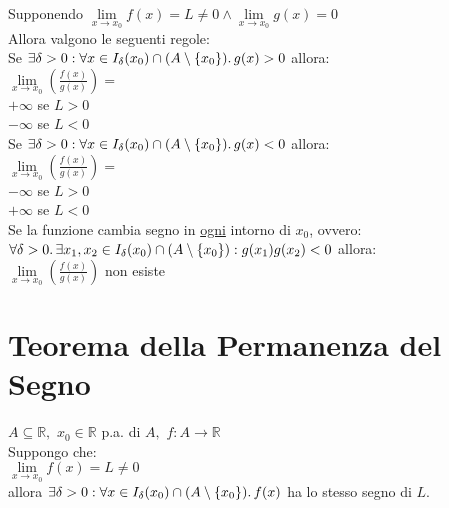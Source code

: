 \documentclass[a4paper, twoside, italian, 11pt]{book}
\newcommand{\braces}[1] {\left \{ #1 \right \}}
\newcommand{\R}{\mathbb{R}}
\begin{document}
\noindent
Supponendo $\lim\limits_{x \to x_0} f(x) = L \neq 0 \land \lim\limits_{x \to x_0} g(x) = 0$ \\

\noindent
Allora valgono le seguenti regole: \\

\noindent
Se $\exists \delta > 0 : \forall x \in I_\delta(x_0) \cap (A \setminus \braces{x_0}) \ldotp g(x) > 0$ allora: \\

\noindent
$\lim\limits_{x \to x_0} (\frac{f(x)}{g(x)}) =$ \\

\noindent
$+\infty$ se $L > 0$ \\
$-\infty$ se $L < 0$ \\

\noindent
Se $\exists \delta > 0 : \forall x \in I_\delta(x_0) \cap (A \setminus \braces{x_0}) \ldotp g(x) < 0$ allora: \\

\noindent
$\lim\limits_{x \to x_0} (\frac{f(x)}{g(x)}) =$ \\

\noindent
$-\infty$ se $L > 0$ \\
$+\infty$ se $L < 0$ \\

\noindent
Se la funzione cambia segno in \underline{ogni} intorno di $x_0$, ovvero: \\
$\forall \delta > 0 \ldotp \exists x_1, x_2 \in I_\delta(x_0) \cap (A \setminus \braces{x_0}) : g(x_1)g(x_2) < 0$ allora: \\

\noindent
$\lim\limits_{x \to x_0} (\frac{f(x)}{g(x)})$ non esiste



\section{Teorema della Permanenza del Segno}

\noindent
$A \subseteq \R,$ $x_0 \in \R$ p.a. di $A,$ $f : A \rightarrow \R$ \\

\noindent
Suppongo che: \\

\noindent
$\lim\limits_{x \to x_0} f(x) = L \neq 0$ \\

\noindent
allora $\exists \delta > 0 : \forall x \in I_\delta(x_0) \cap (A \setminus \braces{x_0}) \ldotp f(x)$ ha lo stesso segno di $L$.
\end{document}
